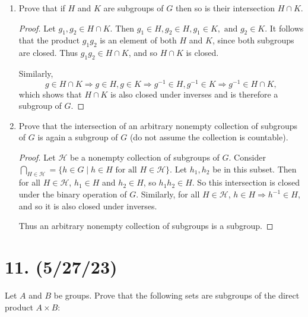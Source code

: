 \documentclass{article}
\begin{document}
\begin{enumerate}[label=(\alph*)]
    \item Prove that if $H$ and $K$ are subgroups of $G$ then so is their intersection $H \cap K$.
          \begin{proof}
            Let $g_1, g_2 \in H \cap K$. Then $g_1 \in H, g_2 \in H, g_1 \in K, \text{ and } g_2 \in K$. It follows that the product $g_1 g_2$ is an element of both $H$ and $K$, since both subgroups are closed. Thus $g_1 g_2 \in H \cap K$, and so $H \cap K$ is closed.

            Similarly, 
            \begin{equation*}
                g \in H \cap K \Rightarrow g \in H, g \in K \Rightarrow g^{-1} \in H, g^{-1} \in K \Rightarrow g^{-1} \in H \cap K,
            \end{equation*}
            which shows that $H \cap K$ is also closed under inverses and is therefore a subgroup of $G$.
          \end{proof}
    \item Prove that the intersection of an arbitrary nonempty collection of subgroups of $G$ is again a subgroup of $G$ (do not assume the collection is countable).
          \begin{proof}
            Let $\mathcal{H}$ be a nonempty collection of subgroups of $G$. Consider $\bigcap_{H \in \mathcal{H}} = \{ h \in G \mid h \in H \text{ for all } H \in \mathcal{H} \}$. Let $h_1, h_2$ be in this subset. Then for all $H \in \mathcal{H}$, $h_1 \in H$ and $h_2 \in H$, so $h_1 h_2 \in H$. So this intersection is closed under the binary operation of $G$. Similarly, for all $H \in \mathcal{H}$, $h \in H \Rightarrow h^{-1} \in H$, and so it is also closed under inverses.

            Thus an arbitrary nonempty collection of subgroups is a subgroup.
          \end{proof}
\end{enumerate}

\section*{11. (5/27/23)}

Let $A$ and $B$ be groups. Prove that the following sets are subgroups of the direct product $A \times B$:
\end{document}
